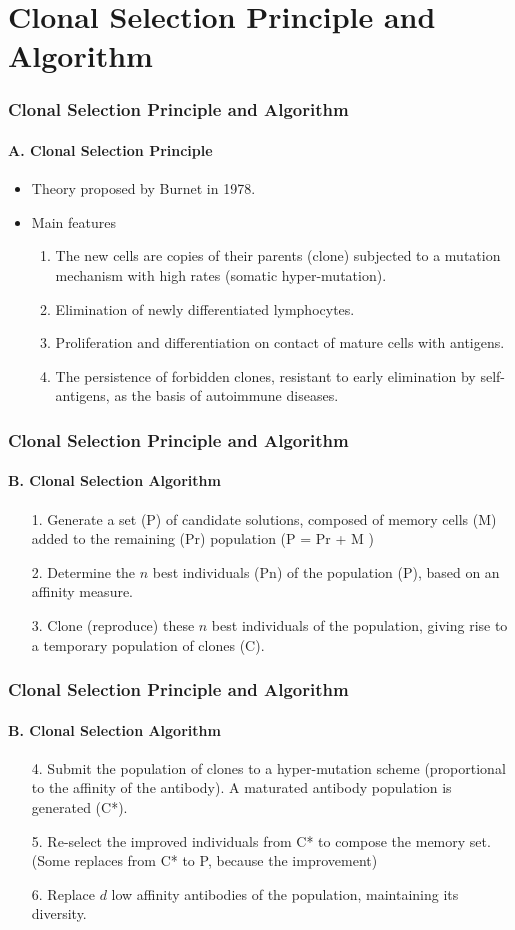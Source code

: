\section{Clonal Selection Principle and Algorithm}
\frame
{
\frametitle{Clonal Selection Principle and Algorithm}
\framesubtitle{A. Clonal Selection Principle}
\begin{itemize}
	\item Theory proposed by Burnet in 1978.
	\item Main features
	\begin{enumerate}
		\item The new cells are copies of their parents (clone) subjected to a mutation mechanism with high rates (somatic hyper-mutation).
		\item Elimination of newly differentiated lymphocytes.
		\item Proliferation and differentiation on contact of mature cells with antigens.
		\item The persistence of forbidden clones, resistant to early elimination by self-antigens, as the basis of autoimmune diseases.
	\end{enumerate}
\end{itemize}
}

\frame
{
\frametitle{Clonal Selection Principle and Algorithm}
\framesubtitle{B. Clonal Selection Algorithm}
\begin{itemize}
	\item[1.] Generate a set (P) of candidate solutions, composed of memory cells (M) added to the remaining (Pr) population (P = Pr + M )
	\item[2.] Determine the $n$ best individuals (Pn) of the population (P), based on an affinity measure.
	\item[3.] Clone (reproduce) these $n$ best individuals of the population, giving rise to a temporary population of clones (C).
\end{itemize}
}
\frame
{
\frametitle{Clonal Selection Principle and Algorithm}
\framesubtitle{B. Clonal Selection Algorithm}
\begin{itemize}
	\item[4.] Submit the population of clones to a hyper-mutation scheme (proportional to the affinity of the antibody). A maturated antibody population is generated (C*).
	\item[5.] Re-select the improved individuals from C* to compose the memory set. (Some replaces from C* to P, because the improvement)
	\item[6.] Replace $d$ low affinity antibodies of the population, maintaining its diversity.
\end{itemize}
}
